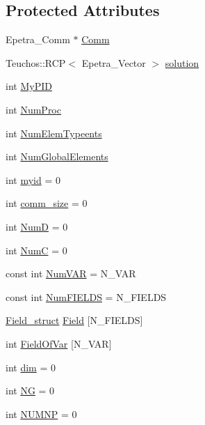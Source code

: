\subsection*{Protected Attributes}
\begin{DoxyCompactItemize}
\item 
Epetra\+\_\+\+Comm $\ast$ \hyperlink{classGeProb_a28a1d41fc8c294fe629b95901df8f4e3}{Comm}
\item 
Teuchos\+::\+R\+CP$<$ Epetra\+\_\+\+Vector $>$ \hyperlink{classGeProb_af084ddda2d2d48a332141881d7b22a7d}{solution}
\item 
int \hyperlink{classGeProb_a646b814acd21db4a20bbbd9fe159da3f}{My\+P\+ID}
\item 
int \hyperlink{classGeProb_a8678d8a8dc17175ba98761beeccc0e04}{Num\+Proc}
\item 
int \hyperlink{classGeProb_a1555edf9114f6b65ef9a7820dfc16e63}{Num\+Elem\+Typeents}
\item 
int \hyperlink{classGeProb_af87232ea7d32eff7618f97a9792b3761}{Num\+Global\+Elements}
\item 
int \hyperlink{classGeProb_a45014741c0457991fb88b1dc1d2d31bc}{myid} = 0
\item 
int \hyperlink{classGeProb_ab5aa970c9864597a442bfc8519352730}{comm\+\_\+size} = 0
\item 
int \hyperlink{classGeProb_a1b63e3bc1b1f5e6582a87b044bbd4ccd}{NumD} = 0
\item 
int \hyperlink{classGeProb_a579ca91b970ea46b1418310eaf5d8b31}{NumC} = 0
\item 
const int \hyperlink{classGeProb_ac6d9c06150838e892ed3eaa1b60bac5d}{Num\+V\+AR} = N\+\_\+\+V\+AR
\item 
const int \hyperlink{classGeProb_adede55ee31a140d1cd8a9076ecdc41e1}{Num\+F\+I\+E\+L\+DS} = N\+\_\+\+F\+I\+E\+L\+DS
\item 
\hyperlink{structField__struct}{Field\+\_\+struct} \hyperlink{classGeProb_aaaeb3e022301e2df5e180af7900a352e}{Field} \mbox{[}N\+\_\+\+F\+I\+E\+L\+DS\mbox{]}
\item 
int \hyperlink{classGeProb_a520a47a06c38cfe59938d2bbd65773a2}{Field\+Of\+Var} \mbox{[}N\+\_\+\+V\+AR\mbox{]}
\item 
int \hyperlink{classGeProb_a122f6dbb7e9a60a35f257ae369a57f77}{dim} = 0
\item 
int \hyperlink{classGeProb_ac9a59a8c31ccad50b7eabc436c365391}{NG} = 0
\item 
int \hyperlink{classGeProb_adf7ed4cdeae11b7e6f15acc0ca7c1d21}{N\+U\+M\+NP} = 0
\item 

\end{DoxyCompactItemize}
